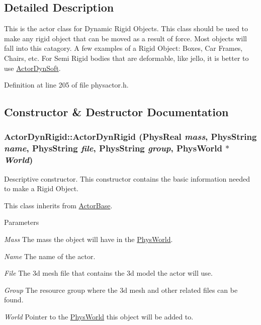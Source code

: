\subsection{Detailed Description}
This is the actor class for Dynamic Rigid Objects. This class should be used to make any rigid object that can be moved as a result of force. Most objects will fall into this catagory. A few examples of a Rigid Object: Boxes, Car Frames, Chairs, etc. For Semi Rigid bodies that are deformable, like jello, it is better to use \hyperlink{classActorDynSoft}{ActorDynSoft}. 

Definition at line 205 of file physactor.h.

\subsection{Constructor \& Destructor Documentation}
\hypertarget{classActorDynRigid_a1402924eddf33a4789e3c3f68bbf6c98}{
\subsubsection[{ActorDynRigid}]{\setlength{\rightskip}{0pt plus 5cm}ActorDynRigid::ActorDynRigid (PhysReal {\em mass}, \/  PhysString {\em name}, \/  PhysString {\em file}, \/  PhysString {\em group}, \/  {\bf PhysWorld} $\ast$ {\em World})}}
\label{d4/d0e/classActorDynRigid_a1402924eddf33a4789e3c3f68bbf6c98}


Descriptive constructor. This constructor contains the basic information needed to make a Rigid Object. \par
 This class inherits from \hyperlink{classActorBase}{ActorBase}. 
\begin{DoxyParams}{Parameters}
\item[{\em Mass}]The mass the object will have in the \hyperlink{classPhysWorld}{PhysWorld}. \item[{\em Name}]The name of the actor. \item[{\em File}]The 3d mesh file that contains the 3d model the actor will use. \item[{\em Group}]The resource group where the 3d mesh and other related files can be found. \item[{\em World}]Pointer to the \hyperlink{classPhysWorld}{PhysWorld} this object will be added to. \end{DoxyParams}


